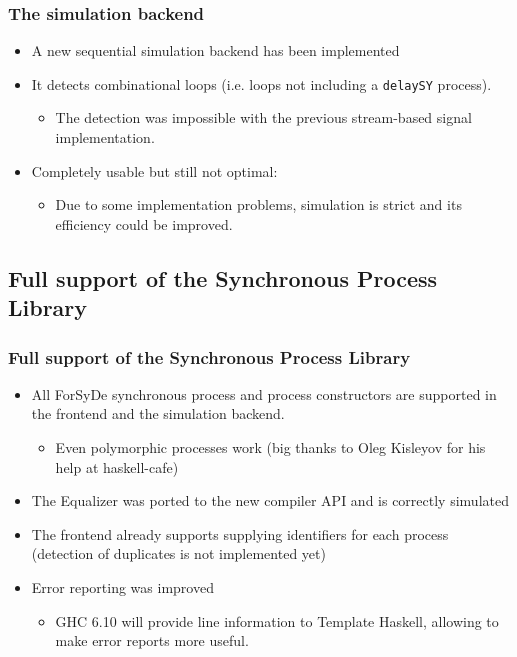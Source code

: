 \documentclass{beamer}
\begin{document}
\begin{frame}[fragile]
  \frametitle{The simulation backend}
\begin{itemize}
 \item A new sequential simulation backend has been implemented
\begin{center}
\end{center}
 \item<2-> It detects combinational loops (i.e. loops not including a \texttt{delaySY} process).
   \begin{itemize}
    \item The detection was impossible with the previous stream-based signal implementation.
    \end{itemize}
  \item<3-> Completely usable but still not optimal:
  \begin{itemize}   
   \item Due to some implementation problems, simulation is strict and its efficiency could be improved.
  \end{itemize}  
  \end{itemize}
\end{frame}



\subsection{Full support of the Synchronous Process Library}

\begin{frame}
  \frametitle{Full support of the Synchronous Process Library}
 \begin{itemize}
 \item  All ForSyDe synchronous process and process constructors are supported in the frontend and the simulation backend.
  \begin{itemize}
  \item Even polymorphic processes work (big thanks to Oleg Kisleyov for his help at haskell-cafe) 
  \end{itemize}
 \item<2-> The Equalizer was ported to the new compiler API and
 is correctly simulated
 \item<3-> The frontend already supports supplying identifiers for each process (detection of duplicates is not implemented yet)
 \item<4->  Error reporting was improved
 \begin{itemize}
 \item GHC 6.10 will provide line information to Template Haskell, allowing to make error reports more useful.
 \end{itemize}
  \end{itemize}
\end{frame}
\end{document}
